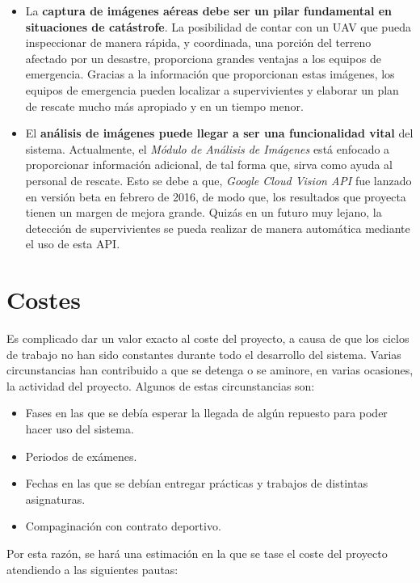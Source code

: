 \begin{itemize}
\item La \textbf{captura de imágenes aéreas debe ser un pilar fundamental en situaciones de catástrofe}. La posibilidad de contar con un \acs{UAV} que pueda inspeccionar de manera rápida, y coordinada, una porción del terreno afectado por un desastre, proporciona grandes ventajas a los equipos de emergencia. Gracias a la información que proporcionan estas imágenes, los equipos de emergencia pueden localizar a supervivientes y elaborar un plan de rescate mucho más apropiado y en un tiempo menor.
\item El \textbf{análisis de imágenes puede llegar a ser una funcionalidad vital} del sistema. Actualmente, el \textit{Módulo de Análisis de Imágenes} está enfocado a proporcionar información adicional, de tal forma que, sirva como ayuda al personal de rescate. Esto se debe a que, \textit{Google Cloud Vision \acs{API}} fue lanzado en versión beta en febrero de 2016, de modo que, los resultados que proyecta tienen un margen de mejora grande. Quizás en un futuro muy lejano, la detección de supervivientes se pueda realizar de manera automática mediante el uso de esta \acs{API}.
\end{itemize}


\section{Costes}

Es complicado dar un valor exacto al coste del proyecto, a causa de que los ciclos de trabajo no han sido constantes durante todo el desarrollo del sistema. Varias circunstancias han contribuido a que se detenga o se aminore, en varias ocasiones, la actividad del proyecto. Algunos de estas circunstancias son:

\begin{itemize}
\item Fases en las que se debía esperar la llegada de algún repuesto para poder hacer uso del sistema.
\item Periodos de exámenes.
\item Fechas en las que se debían entregar prácticas y trabajos de distintas asignaturas.
\item Compaginación con contrato deportivo.
\end{itemize}  

Por esta razón, se hará una estimación en la que se tase el coste del proyecto atendiendo a las siguientes pautas:

